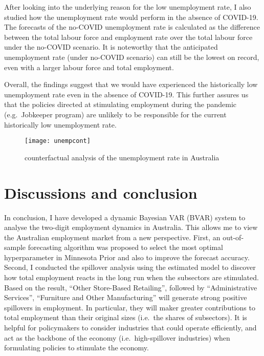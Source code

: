\documentclass{monashthesis}
\begin{document}
After looking into the underlying reason for the low unemployment rate, I also studied how the unemployment rate would perform in the absence of COVID-19. The forecasts of the no-COVID unemployment rate is calculated as the difference between the total labour force and employment rate over the total labour force under the no-COVID scenario. It is noteworthy that the anticipated unemployment rate (under no-COVID scenario) can still be the lowest on record, even with a larger labour force and total employment.

Overall, the findings suggest that we would have experienced the historically low unemployment rate even in the absence of COVID-19. This further assures us that the policies directed at stimulating employment during the pandemic (e.g.~Jobkeeper program) are unlikely to be responsible for the current historically low unemployment rate.

\begin{figure}[H]
\texttt{[image: unempcont]}
\centering
\caption{counterfactual analysis of the unemployment rate in Australia}
\label{fig:unrate}
\end{figure}

\clearpage

\hypertarget{discussions-and-conclusion}{%
\chapter{Discussions and conclusion}\label{discussions-and-conclusion}}

In conclusion, I have developed a dynamic Bayesian VAR (BVAR) system to analyse the two-digit employment dynamics in Australia. This allows me to view the Australian employment market from a new perspective. First, an out-of-sample forecasting algorithm was proposed to select the most optimal hyperparameter in Minnesota Prior and also to improve the forecast accuracy. Second, I conducted the spillover analysis using the estimated model to discover how total employment reacts in the long run when the subsectors are stimulated. Based on the result, ``Other Store-Based Retailing'', followed by ``Administrative Services'', ``Furniture and Other Manufacturing'' will generate strong positive spillovers in employment. In particular, they will maker greater contributions to total employment than their original sizes (i.e.~the shares of subsectors). It is helpful for policymakers to consider industries that could operate efficiently, and act as the backbone of the economy (i.e.~high-spillover industries) when formulating policies to stimulate the economy.
\end{document}
